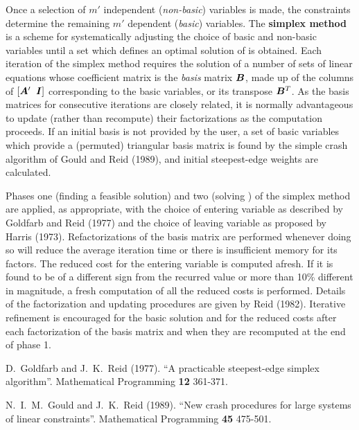 \documentclass{galahad}
\begin{document}
Once a selection of $m'$ independent ({\em non-basic}) variables
is made, the constraints   determine the remaining $m'$
dependent ({\em basic}) variables. The {\bf simplex method}
is a scheme for systematically adjusting the choice of basic
and non-basic variables until a set which defines an optimal
solution of  is obtained. Each
iteration of the simplex method requires the solution of a number
of sets of linear equations whose coefficient matrix is the
{\em basis} matrix ${\bm{B}}$, made up of the columns of $[{\bm{A}}' \;\; {\bm{I}}]$
corresponding to the
basic variables, or its transpose ${\bm{B}}^T$. As the basis matrices for
consecutive iterations are closely related, it is normally
advantageous to update (rather than recompute) their factorizations
as the computation proceeds.
If an initial basis is not provided by the user,
a set of basic variables which provide a (permuted)
triangular basis matrix is found by the simple crash algorithm of
Gould and Reid (1989), and initial steepest-edge weights are calculated.

Phases one (finding a feasible solution)
and two (solving ) of the simplex method are applied, as
appropriate, with the choice of entering variable as described
by Goldfarb and Reid (1977) and the
choice of leaving variable as proposed by Harris (1973).
Refactorizations of the basis matrix are performed whenever doing so
will reduce the average iteration time or there is insufficient memory
for its factors.
The reduced cost for the entering variable is computed afresh. If it
is found to be of a different sign from the recurred value or more than
10\% different in magnitude, a fresh computation of all the reduced
costs is performed.
Details of the factorization and updating procedures are given by
Reid (1982).
Iterative refinement is encouraged for the basic solution and for
the reduced costs after each factorization
of the basis matrix and when they are recomputed at the end of phase 1.

\vspace*{1mm}

\galreferences
\vspace*{1mm}

\noindent
D.\ Goldfarb and J.\ K.\ Reid (1977).
``A practicable steepest-edge simplex algorithm''.
Mathematical Programming {\bf 12} 361-371.
\vspace*{1mm}

\noindent
N.\ I.\ M.\ Gould and J.\ K.\ Reid (1989).
``New crash procedures for large systems of linear constraints''.
Mathematical Programming {\bf 45} 475-501.
\vspace*{1mm}
\end{document}
